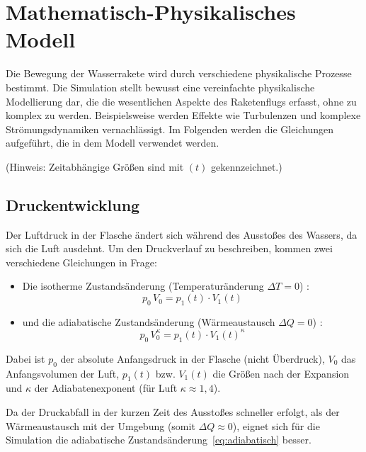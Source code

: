 \documentclass{SimSemBericht} %
\begin{document}
\section{Mathematisch-Physikalisches Modell}
Die Bewegung der Wasserrakete wird durch verschiedene physikalische Prozesse bestimmt. 
Die Simulation stellt bewusst eine vereinfachte physikalische Modellierung dar, die die wesentlichen Aspekte des Raketenflugs erfasst, ohne zu komplex zu werden. 
Beispielsweise werden Effekte wie Turbulenzen und komplexe Strömungsdynamiken vernachlässigt.
Im Folgenden werden die Gleichungen aufgeführt, die in dem Modell verwendet werden.

(Hinweis: Zeitabhängige Größen sind mit \( (t) \) gekennzeichnet.)

\subsection{Druckentwicklung}
Der Luftdruck in der Flasche ändert sich während des Ausstoßes des Wassers, da sich die Luft ausdehnt. Um den Druckverlauf zu beschreiben, kommen zwei verschiedene Gleichungen in Frage:

\begin{itemize}   
    \item Die isotherme Zustandsänderung (Temperaturänderung \(\Delta T = 0\)) \cite{formelsammlung2024}:       %
    \begin{equation}p_0 \, V_0 = p_1(t) \cdot V_1(t)\end{equation}
    \item und die adiabatische Zustandsänderung (Wärmeaustausch \(\Delta Q = 0\)) \cite{formelsammlung2024}:    %
    \begin{equation}
        p_0 \, V_0^\kappa = p_1(t) \cdot V_1(t)^\kappa
        \label{eq:adiabatisch}
    \end{equation}
\end{itemize}
Dabei ist $p_0$ der absolute Anfangsdruck in der Flasche (nicht Überdruck), $V_0$ das Anfangsvolumen der Luft, $p_1(t)$ bzw. $V_1(t)$ die Größen nach der Expansion und $\kappa$ der Adiabatenexponent (für Luft $\kappa \approx 1{,}4$).

Da der Druckabfall in der kurzen Zeit des Ausstoßes schneller erfolgt, als der Wärmeaustausch mit der Umgebung (somit \(\Delta Q \approx 0\)), eignet sich für die Simulation die adiabatische Zustandsänderung~\eqref{eq:adiabatisch} besser.
\end{document}
